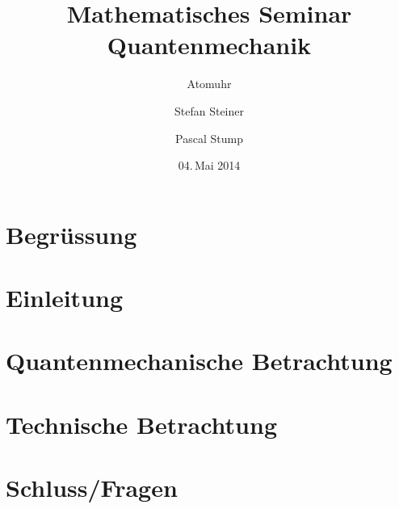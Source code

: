 \documentclass[compressd]
{beamer}
\title[MathSem QM]{Mathematisches Seminar Quantenmechanik}
\subtitle{Atomuhr}
\author{Stefan Steiner \and Pascal Stump}
\institute{HSR Hochschule für Technik Rapperswil}
\date{04.\,Mai 2014}
\begin{document}
	
	\begin{frame}
		\titlepage
	\end{frame}
	
	\section*{Begrüssung}
	
	
	\section{Einleitung}
	

	\section[Math]{Quantenmechanische Betrachtung}
	
	
	\section[Tech]{Technische Betrachtung}
	 
		
	\section[?]{ Schluss/Fragen}
	
	
\end{document}
